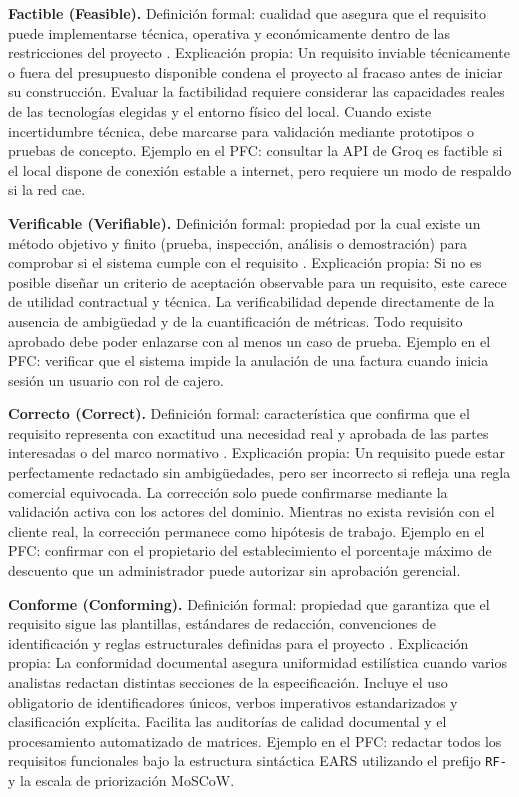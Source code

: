 \documentclass[onecolumn,12pt]{IEEEtran}
\begin{document}
	\textbf{Factible (Feasible).} Definici\'on formal: cualidad que asegura que el requisito puede implementarse t\'ecnica, operativa y econ\'omicamente dentro de las restricciones del proyecto \cite{iso29148,ireb2023}. Explicaci\'on propia: Un requisito inviable t\'ecnicamente o fuera del presupuesto disponible condena el proyecto al fracaso antes de iniciar su construcci\'on. Evaluar la factibilidad requiere considerar las capacidades reales de las tecnolog\'ias elegidas y el entorno f\'isico del local. Cuando existe incertidumbre t\'ecnica, debe marcarse para validaci\'on mediante prototipos o pruebas de concepto. Ejemplo en el PFC: consultar la API de Groq es factible si el local dispone de conexi\'on estable a internet, pero requiere un modo de respaldo si la red cae.
	
	\textbf{Verificable (Verifiable).} Definici\'on formal: propiedad por la cual existe un m\'etodo objetivo y finito (prueba, inspecci\'on, an\'alisis o demostraci\'on) para comprobar si el sistema cumple con el requisito \cite{iso29148,pohl2025,swebok4}. Explicaci\'on propia: Si no es posible dise\~nar un criterio de aceptaci\'on observable para un requisito, este carece de utilidad contractual y t\'ecnica. La verificabilidad depende directamente de la ausencia de ambig\"uedad y de la cuantificaci\'on de m\'etricas. Todo requisito aprobado debe poder enlazarse con al menos un caso de prueba. Ejemplo en el PFC: verificar que el sistema impide la anulaci\'on de una factura cuando inicia sesi\'on un usuario con rol de cajero.
	
	\textbf{Correcto (Correct).} Definici\'on formal: caracter\'istica que confirma que el requisito representa con exactitud una necesidad real y aprobada de las partes interesadas o del marco normativo \cite{iso29148,pohl2025}. Explicaci\'on propia: Un requisito puede estar perfectamente redactado sin ambig\"uedades, pero ser incorrecto si refleja una regla comercial equivocada. La correcci\'on solo puede confirmarse mediante la validaci\'on activa con los actores del dominio. Mientras no exista revisi\'on con el cliente real, la correcci\'on permanece como hip\'otesis de trabajo. Ejemplo en el PFC: confirmar con el propietario del establecimiento el porcentaje m\'aximo de descuento que un administrador puede autorizar sin aprobaci\'on gerencial.
	
	\textbf{Conforme (Conforming).} Definici\'on formal: propiedad que garantiza que el requisito sigue las plantillas, est\'andares de redacci\'on, convenciones de identificaci\'on y reglas estructurales definidas para el proyecto \cite{iso29148}. Explicaci\'on propia: La conformidad documental asegura uniformidad estil\'istica cuando varios analistas redactan distintas secciones de la especificaci\'on. Incluye el uso obligatorio de identificadores \'unicos, verbos imperativos estandarizados y clasificaci\'on expl\'icita. Facilita las auditor\'ias de calidad documental y el procesamiento automatizado de matrices. Ejemplo en el PFC: redactar todos los requisitos funcionales bajo la estructura sint\'actica EARS utilizando el prefijo \texttt{RF-} y la escala de priorizaci\'on MoSCoW.
	
\end{document}
